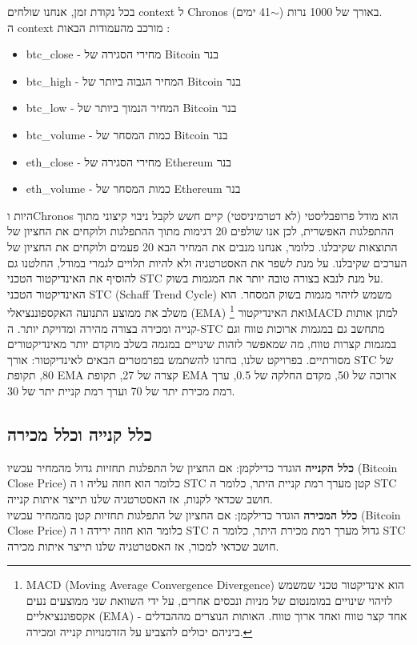 \documentclass[a4paper,11pt]{article}
\newcommand{\te}[1]{\textenglish{#1}}
\begin{document}
\begin{RTL}
בכל נקודת זמן, אנחנו שולחים \te{context} ל \te{Chronos} באורך של 1000 נרות ($\sim$41 ימים).
\\
 ה \te{context} מורכב מהעמודות הבאות :
\begin{itemize}
    \item \te{btc\_close} - מחירי הסגירה של \te{Bitcoin} בנר
    \item \te{btc\_high} - המחיר הגבוה ביותר של \te{Bitcoin} בנר
    \item \te{btc\_low} - המחיר הנמוך ביותר של \te{Bitcoin} בנר
    \item \te{btc\_volume} - כמות המסחר של \te{Bitcoin} בנר
    \item \te{eth\_close} - מחירי הסגירה של \te{Ethereum} בנר
    \item \te{eth\_volume} - כמות המסחר של \te{Ethereum} בנר
\end{itemize}
היות ו\te{Chronos} הוא מודל פרופבליסטי (לא דטרמיניסטי) קיים חשש לקבל ניבוי קיצוני מתוך ההתפלגות האפשרית, לכן אנו שולפים 20 דגימות מתוך ההתפלגות ולוקחים את החציון של התוצאות שקיבלנו. כלומר, אנחנו מנבים את המחיר הבא 20 פעמים ולוקחים את החציון של הערכים שקיבלנו. על מנת לשפר את האסטרטגיה ולא להיות תלויים לגמרי במודל, החלטנו גם להוסיף את האינדיקטור הטכני \te{STC} על מנת לנבא בצורה טובה יותר את המגמות בשוק.
\\
האינדיקטור הטכני \te{STC (Schaff Trend Cycle)} משמש לזיהוי מגמות בשוק המסחר. הוא משלב את ממוצע התנועה האקספוננציאלי \te{(EMA)} ואת האינדיקטור \footnote{\te{MACD (Moving Average Convergence Divergence)} הוא אינדיקטור טכני שמשמש לזיהוי שינויים במומנטום של מניות ונכסים אחרים, על ידי השוואת שני ממוצעים נעים אקספוננציאליים \te{(EMA)} - אחד קצר טווח ואחד ארוך טווח. האותות הנוצרים מההבדלים ביניהם יכולים להצביע על הזדמנויות קנייה ומכירה.}\te{MACD} למתן אותות קנייה ומכירה בצורה מהירה ומדויקת יותר. ה-\te{STC} מתחשב גם במגמות ארוכות טווח וגם במגמות קצרות טווח, מה שמאפשר לזהות שינויים במגמה בשלב מוקדם יותר מאינדיקטורים מסורתיים. בפרויקט שלנו, בחרנו להשתמש בפרמטרים הבאים לאינדיקטור: אורך \te{STC} של 80, תקופת \te{EMA} קצרה של 27, תקופת \te{EMA} ארוכה של 50, מקדם החלקה של 0.5, ערך רמת מכירת יתר של 70 וערך רמת קניית יתר של 30.
 
\subsection*{כלל קנייה וכלל מכירה}
\textbf{כלל הקנייה} הוגדר כדילקמן: אם החציון של התפלגות תחזיות גדול מהמחיר עכשיו (\te{Bitcoin Close Price}) כלומר הוא חוזה עליה ו ה \te{STC} קטן מערך רמת קניית היתר, כלומר ה \te{STC} חושב שכדאי לקנות, אז האסטרטגיה שלנו תייצר איתות קנייה.
\\
\textbf{כלל המכירה} הוגדר כדילקמן: אם החציון של התפלגות תחזיות קטן מהמחיר עכשיו (\te{Bitcoin Close Price}) כלומר הוא חוזה ירידה ו ה \te{STC} גדול מערך רמת מכירת היתר, כלומר ה \te{STC} חושב שכדאי למכור, אז האסטרטגיה שלנו תייצר איתות מכירה.

\end{RTL}
\end{document}
